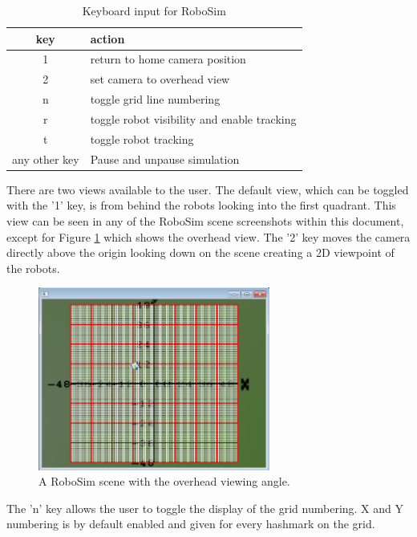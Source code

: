 \documentclass{article}
\begin{document}
\begin{table}[H]
	\begin{center}
	\begin{tabular}{c | l }
		\hline \hline
		\textbf{key} & \textbf{action} \\ \hline
		1 & return to home camera position \\
		2 & set camera to overhead view \\
		n & toggle grid line numbering \\
		r & toggle robot visibility and enable tracking \\
		t & toggle robot tracking \\
		any other key & Pause and unpause simulation \\
		\hline \hline
	\end{tabular}
	\caption{Keyboard input for RoboSim}
	\label{tab:keys}
	\end{center}
\end{table}

There are two views available to the user.  The default view, which can be
toggled with the '1' key, is from behind the robots looking into the first
quadrant.  This view can be seen in any of the RoboSim scene screenshots within
this document, except for Figure \ref{fig:robosim_overhead} which shows the
overhead view.  The '2' key moves the camera directly above the origin looking
down on the scene creating a 2D viewpoint of the robots.
\begin{figure}[H]
	\begin{center}
		\includegraphics[width=3in]{images/robosim_overhead}
	\end{center}
	\caption{A RoboSim scene with the overhead viewing angle.}
	\label{fig:robosim_overhead}
\end{figure}

The 'n' key allows the user to toggle the display of the grid numbering.  X and
Y numbering is by default enabled and given for every hashmark on the grid.
\end{document}
